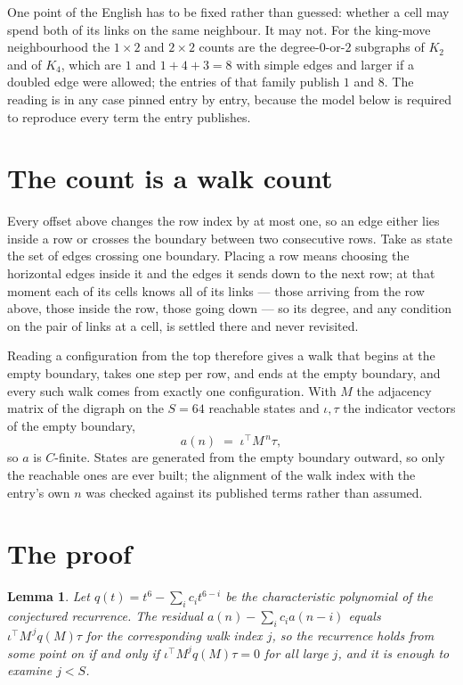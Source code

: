 \documentclass[11pt,a4paper]{article}
\theoremstyle{plain}
\newtheorem{lemma}[theorem]{Lemma}
\theoremstyle{definition}
\begin{document}
One point of the English has to be fixed rather than guessed: whether a cell may spend both of
its links on the same neighbour. It may not. For the king-move neighbourhood the $1\times2$
and $2\times2$ counts are the degree-$0$-or-$2$ subgraphs of $K_2$ and of $K_4$, which are $1$
and $1+4+3=8$ with simple edges and larger if a doubled edge were allowed; the entries of that
family publish $1$ and $8$. The reading is in any case pinned entry by entry, because the
model below is required to reproduce every term the entry publishes.


\section{The count is a walk count}

Every offset above changes the row index by at most one, so an edge either lies inside a row
or crosses the boundary between two consecutive rows. Take as state the set of edges crossing
one boundary. Placing a row means choosing the horizontal edges inside it and the edges it
sends down to the next row; at that moment each of its cells knows all of its links --- those
arriving from the row above, those inside the row, those going down --- so its degree, and any
condition on the pair of links at a cell, is settled there and never revisited.

Reading a configuration from the top therefore gives a walk that begins at the empty boundary,
takes one step per row, and ends at the empty boundary, and every such walk comes from exactly
one configuration. With $M$ the adjacency matrix of the digraph on the $S=64$ reachable
states and $\iota,\tau$ the indicator vectors of the empty boundary,
\[
a(n)\;=\;\iota^{\!\top}M^{\,n}\tau ,
\]
so $a$ is $C$-finite. States are generated from the empty boundary outward, so only the
reachable ones are ever built; the alignment of the walk index with the entry's own $n$ was
checked against its published terms rather than assumed.

\section{The proof}

\begin{lemma}\label{lem:crit}
Let $q(t)=t^{6}-\sum_i c_it^{6-i}$ be the characteristic polynomial of the
conjectured recurrence. The residual $a(n)-\sum_ic_ia(n-i)$ equals
$\iota^{\!\top}M^{\,j}q(M)\tau$ for the corresponding walk index $j$, so the recurrence
holds from some point on if and only if $\iota^{\!\top}M^{j}q(M)\tau=0$ for all large $j$,
and it is enough to examine $j<S$.
\end{lemma}
\end{document}
